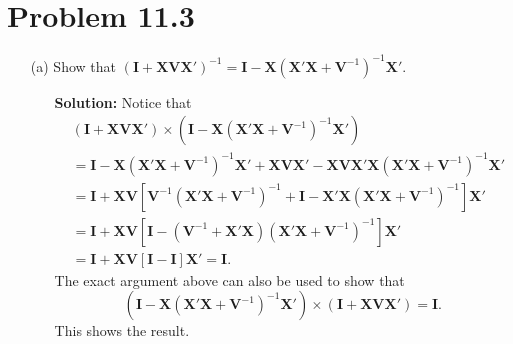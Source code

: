 \documentclass[11pt]{article}
\begin{document}
\section*{Problem 11.3}
\begin{itemize}
\item[(a)] Show that $(\textbf{I} + \textbf{X}\textbf{V}\textbf{X}')^{-1} = \textbf{I} - \textbf{X}(\textbf{X}'\textbf{X} + \textbf{V}^{-1})^{-1}\textbf{X}'.$
\begin{itemize}
\item[] \textbf{Solution:}  Notice that
\begin{align*}
&(\textbf{I} + \textbf{X}\textbf{V}\textbf{X}')\times (\textbf{I} - \textbf{X}(\textbf{X}'\textbf{X} + \textbf{V}^{-1})^{-1}\textbf{X}') \\
&= \textbf{I} - \textbf{X}(\textbf{X}'\textbf{X} + \textbf{V}^{-1})^{-1}\textbf{X}' + \textbf{X}\textbf{V}\textbf{X}' - \textbf{X}\textbf{V}\textbf{X}'\textbf{X}(\textbf{X}'\textbf{X} + \textbf{V}^{-1})^{-1}\textbf{X}' \\
 &= \textbf{I} + \mathbf{X}\mathbf{V}\left[\textbf{V}^{-1}(\textbf{X}'\textbf{X} + \textbf{V}^{-1})^{-1} + \textbf{I} -  \textbf{X}'\textbf{X}(\textbf{X}'\textbf{X} + \textbf{V}^{-1})^{-1}\right] \mathbf{X}' \\
 &= \textbf{I} + \mathbf{X}\mathbf{V}\left[\textbf{I} - (\mathbf{V}^{-1} + \mathbf{X}'\mathbf{X})(\textbf{X}'\textbf{X} + \textbf{V}^{-1})^{-1}\right] \mathbf{X}' \\
 &= \mathbf{I} + \mathbf{X}\textbf{V}[\mathbf{I}-\textbf{I}]\mathbf{X}' = \mathbf{I}.
\end{align*}
The exact argument above can also be used to show that
\[
(\textbf{I} - \textbf{X}(\textbf{X}'\textbf{X} + \textbf{V}^{-1})^{-1}\textbf{X}')\times (\textbf{I} + \textbf{X}\textbf{V}\textbf{X}') = \mathbf{I}.
\]
This shows the result.
\end{itemize}


\end{itemize}
\end{document}
